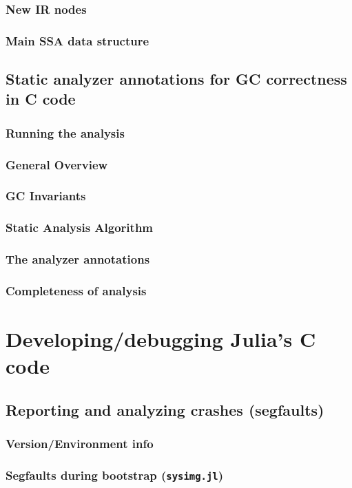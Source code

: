     \subsection{New IR nodes}
    \subsection{Main SSA data structure}
    \section{Static analyzer annotations for GC correctness in C code}
    \subsection{Running the analysis}
    \subsection{General Overview}
    \subsection{GC Invariants}
    \subsection{Static Analysis Algorithm}
    \subsection{The analyzer annotations}
    \subsection{Completeness of analysis}
  \chapter{Developing/debugging Julia's C code}
    \section{Reporting and analyzing crashes (segfaults)}
    \subsection{Version/Environment info}
    \subsection{Segfaults during bootstrap (\texttt{sysimg.jl})}
